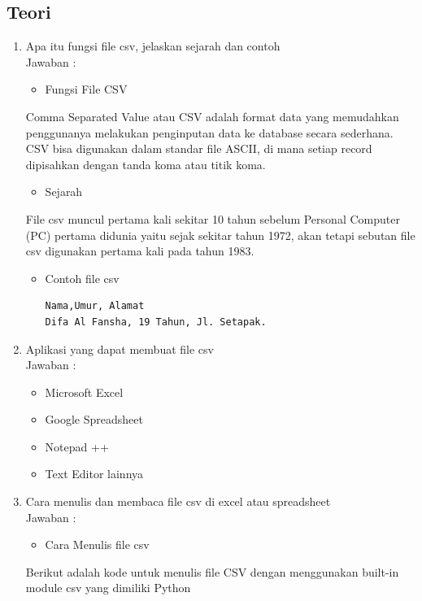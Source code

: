 \subsection{Teori}
\begin{enumerate}

\item Apa itu fungsi file csv, jelaskan sejarah dan contoh\\
Jawaban :

\begin{itemize}
\item Fungsi File CSV
\end{itemize}

Comma Separated Value atau CSV adalah format data yang memudahkan penggunanya melakukan penginputan data ke database secara sederhana. CSV bisa digunakan dalam standar file ASCII, di mana setiap record dipisahkan dengan tanda koma atau titik koma.

\begin{itemize}
\item Sejarah 
\end{itemize}
File csv muncul pertama kali sekitar 10 tahun sebelum Personal Computer (PC) pertama didunia yaitu sejak sekitar tahun 1972, akan tetapi sebutan file csv digunakan pertama kali pada tahun 1983.

\begin{itemize}
\item Contoh file csv
\begin{verbatim}
Nama,Umur, Alamat
Difa Al Fansha, 19 Tahun, Jl. Setapak.
\end{verbatim}
\end{itemize}

\item Aplikasi yang dapat membuat file csv\\
Jawaban :

\begin{itemize}
\item Microsoft Excel
\item Google Spreadsheet
\item Notepad ++
\item Text Editor lainnya
\end{itemize}

\item  Cara menulis dan membaca file csv di excel atau spreadsheet\\
Jawaban :

\begin{itemize}
\item Cara Menulis file csv
\end{itemize}
Berikut adalah kode untuk menulis file CSV dengan menggunakan built-in module csv yang dimiliki Python


\end{enumerate}
